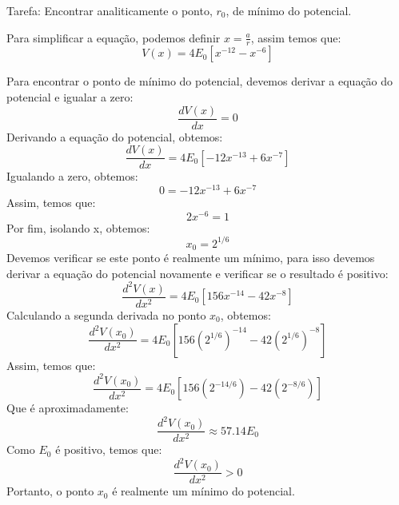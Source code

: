 \documentclass[12pt, a4paper]{article} %
\begin{document}
            Tarefa: Encontrar analiticamente o ponto, $r_{0}$, de m\'inimo do potencial.

            Para simplificar a equa\c{c}\~ao, podemos definir $x = \frac{a}{r}$, assim temos que:
            \begin{equation*}
                V(x) = 4E_{0} \left[ x^{-12} - x^{-6} \right]
            \end{equation*}

            Para encontrar o ponto de m\'inimo do potencial, devemos derivar a equa\c{c}\~ao do potencial e igualar a zero:
            \begin{equation*}
                \frac{dV(x)}{dx} = 0
            \end{equation*}
            Derivando a equa\c{c}\~ao do potencial, obtemos:
            \begin{equation*}
                \frac{dV(x)}{dx} = 4E_{0} \left[ -12{x}^{-13} + 6{x}^{-7} \right]
            \end{equation*}
            Igualando a zero, obtemos:
            \begin{equation*}
                0 = -12{x}^{-13} + 6{x}^{-7}
            \end{equation*}
            Assim, temos que:
            \begin{equation*}
                2{x}^{-6} = 1
            \end{equation*}
            Por fim, isolando x, obtemos:
            \begin{equation*}
                x_{0} = 2^{1/6}
            \end{equation*}
            Devemos verificar se este ponto \'e realmente um m\'inimo, para isso devemos derivar a equa\c{c}\~ao do potencial novamente e verificar se o resultado \'e positivo:
            \begin{equation*}
                \frac{d^{2}V(x)}{dx^{2}} = 4E_{0} \left[ 156{x}^{-14} - 42{x}^{-8} \right]
            \end{equation*}
            Calculando a segunda derivada no ponto $x_{0}$, obtemos:
            \begin{equation*}
                \frac{d^{2}V(x_{0})}{dx^{2}} = 4E_{0} \left[ 156(2^{1/6})^{-14} - 42(2^{1/6})^{-8} \right]
            \end{equation*}
            Assim, temos que:
            \begin{equation*}
                \frac{d^{2}V(x_{0})}{dx^{2}} = 4E_{0} \left[ 156(2^{-14/6}) - 42(2^{-8/6}) \right]
            \end{equation*}
            Que \'e aproximadamente:
            \begin{equation*}
                \frac{d^{2}V(x_{0})}{dx^{2}} \approx 57.14E_{0}
            \end{equation*}
            Como $E_{0}$ \'e positivo, temos que:
            \begin{equation*}
                \frac{d^{2}V(x_{0})}{dx^{2}} > 0
            \end{equation*}
            Portanto, o ponto $x_{0}$ \'e realmente um m\'inimo do potencial.
        
\end{document}
